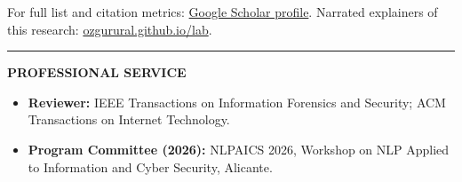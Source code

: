 \documentclass[10pt,a4paper]{article}
\newcommand{\spacedhrule}[2]{\vspace{#1}\hrule\vspace{#2}}
\newcommand{\roottitle}[1]{\par{\large\textbf{#1}}\par\vspace{0.2em}}
\begin{document}
For full list and citation metrics: \href{https://scholar.google.com/citations?user=lYx8fqsAAAAJ&hl=en&sortby=pubdate}{Google Scholar profile}. Narrated explainers of this research: \href{https://ozgurural.github.io/lab/}{ozgurural.github.io/lab}.

\spacedhrule{0.6em}{0.1em}

\roottitle{PROFESSIONAL SERVICE}

\begin{itemize}
  \item \textbf{Reviewer:} IEEE Transactions on Information Forensics and Security; ACM Transactions on Internet Technology.
  \item \textbf{Program Committee (2026):} NLPAICS 2026, Workshop on NLP Applied to Information and Cyber Security, Alicante.
\end{itemize}
\end{document}
